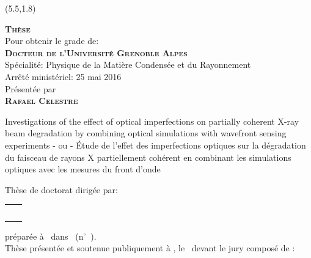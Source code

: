 \documentclass[a4paper, twoside]{report}
\newcommand{\thesisTitle}{Investigations of the effect of optical imperfections on partially coherent X-ray beam degradation by combining optical simulations with wavefront sensing experiments}
\newcommand{\thesisTitleFR}{\'Etude de l'effet des imperfections optiques sur la d\'egradation du faisceau de rayons X partiellement coh\'erent en combinant les simulations optiques avec les mesures du front d'onde}
\begin{document}
\begin{singlespace}
\begin{textblock}{10}(5.5,1.8)
	\color{black}

	\begin{flushleft}
	    \Large \textbf{\textsc{Thèse}}\\
	    \large Pour obtenir le grade de:\\ \bigskip \vfill  
	    \Large \textbf{\textsc{Docteur de l’Université Grenoble Alpes}} \\
        \large Spécialité: Physique de la Matière Condensée et du Rayonnement\\
        \small Arrêté ministériel: 25 mai 2016\\ \bigskip \vfill  
        \large Présentée par\\ \bigskip \vfill 
        \Large \textbf{\textsc{Rafael Celestre}}\\ \bigskip \vfill 
	\end{flushleft}
	\begin{center}
		\Large{\thesisTitle} \bigskip %
		\vfill
		\large{- ou -} \bigskip
		\vfill
		\Large{\thesisTitleFR} \bigskip %
		\vfill
	\end{center}
	\begin{flushleft}
		\normalsize Thèse de doctorat dirigée par: \\ \bigskip
		\small
		\begin{tabular}{@{} L{9.5cm} R{4.5cm}}
    		\jurynameE  \\ \juryadressE & \juryroleE \\
    		\jurynameF  \\ \juryadressF & \juryroleF  \\ \bigskip
	\end{tabular} 
		\normalsize préparée à \PhDworkingplace~dans \ecodoctitle~(n$^{\circ}$~\ecodocnum).\\ \bigskip
		\vfill
		Thèse présentée et soutenue publiquement à , le ~devant le jury composé de :
	\end{flushleft}
	\small


\end{textblock}
\end{singlespace}
\end{document}
